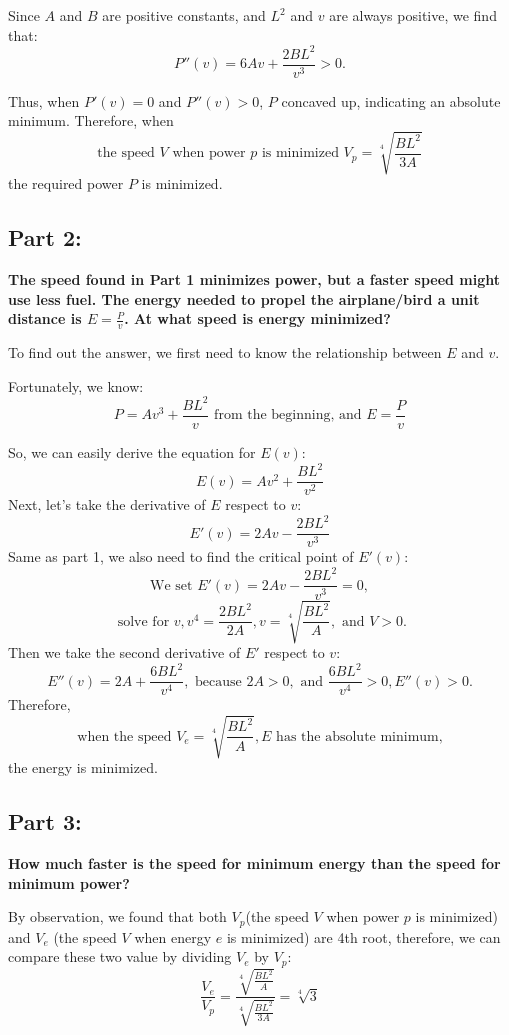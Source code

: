\documentclass{article}
\begin{document}
Since \( A \) and \( B \) are positive constants, and \( L^2 \) and \( v \) are always positive, we find that:
\[
P''(v) = 6Av + \frac{2BL^2}{v^3} > 0.
\]

Thus, when \( P'(v) = 0 \) and \( P''(v) > 0 \), \( P \) concaved up, indicating an absolute minimum. Therefore, when
\[
\text{the speed } V \text{ when power } p \text{ is minimized }  V_p = \sqrt[4]{\frac{BL^2}{3A}}
\]
the required power \( P \) is minimized.

\subsection*{Part 2:}
{\large \bfseries The speed found in Part 1 minimizes power, but a faster speed might use less fuel. The energy needed to propel the airplane/bird a unit distance is \( E = \frac{P}{v} \). At what speed is energy minimized?}

To find out the answer, we first need to know the relationship between \( E \) and \( v \). 

Fortunately, we know:
\[
P = Av^3 + \frac{BL^2}{v} \text{ from the beginning, and }
E = \frac{P}{v}
\]

So, we can easily derive the equation for \( E(v) \):
\[
E(v) = Av^2 + \frac{BL^2}{v^2}
\]
Next, let's take the derivative of \(E\) respect to \(v\):
\[
E'(v) = 2Av-\frac{2BL^2}{v^3}
\]
Same as part 1, we also need to find the critical point of \(E'(v)\):
\[\text{We set } E'(v) = 2Av-\frac{2BL^2}{v^3} = 0,\]
\[\text{ solve for }v, v^4=\frac{2BL^2}{2A}, v = \sqrt[4]{\frac{BL^2}{A}},\text{ and }V > 0.\]
Then we take the second derivative of \(E'\) respect to \(v\):
\[E''(v) = 2A + \frac{6BL^2}{v^4},
\text{ because } 2A > 0, \text{ and } \frac{6BL^2}{v^4} > 0, E''(v) > 0.\]
Therefore,
 \[\text{when the speed }V_e = \sqrt[4]{\frac{BL^2}{A}}, E\text{ has the absolute minimum,}\]
  the energy is minimized.

\subsection*{Part 3:}
{\large \bfseries How much faster is the speed for minimum energy than the speed for minimum power?
}\setlength{\parskip}{1em}

By observation, we found that both \(V_p\)(the speed \(V\) when power \(p\) is minimized) and \(V_e\) (the speed \(V\) when energy \(e\) is minimized) are 4th root, therefore, we can compare these two value by dividing \(V_e\) by \(V_p\):
\[\frac{V_e}{V_p}=\frac{\sqrt[4]{\frac{BL^2}{A}}}{\sqrt[4]{\frac{BL^2}{3A}}} = \sqrt[4]{3}\]
\end{document}
